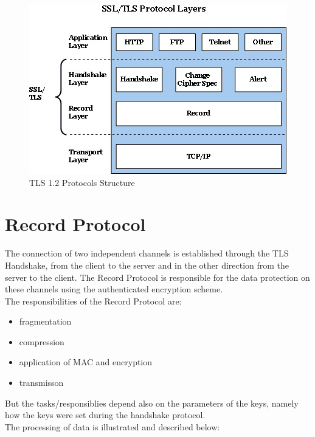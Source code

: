 \begin{figure}[H]
	\centering
		\includegraphics[scale=1]{images/tls_structure.jpg}
	\caption{TLS 1.2 Protocols Structure \cite{ms:overview}}
	\label{fig:tls_structure}
\end{figure}


\section{Record Protocol}
\label{sec:record_protocol}

The connection of two independent channels is established through the TLS Handshake, from the client to the server and in the other direction from the server to the client. The Record Protocol is responsible for the data protection on these channels using the authenticated encryption scheme.\\
The responsibilities of the Record Protocol are:
\begin{itemize}
	\item fragmentation
	\item compression
	\item application of MAC and encryption
	\item transmisson 
\end{itemize}
But the tasks/responsiblies depend also on the parameters of the keys, namely how the keys were set during the handshake protocol. \\

The processing of data is illustrated and described below:      

